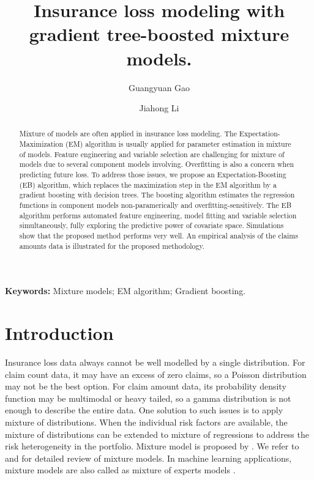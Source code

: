 \documentclass[11pt]{article}
\title{Insurance loss modeling with gradient tree-boosted mixture models.}
\author{Guangyuan Gao \and Jiahong Li}
\numberwithin{equation}{section}
\begin{document}
\maketitle

\begin{abstract}
Mixture of models are often applied in insurance loss modeling. 
The Expectation-Maximization (EM) algorithm is usually applied for parameter estimation in mixture of models. 
Feature engineering and variable selection are challenging for mixture of models due to several component models involving. 
Overfitting is also a concern when predicting future loss. 
To address those issues, we propose an Expectation-Boosting (EB) algorithm, 
which replaces the maximization step in the EM algorithm by a gradient boosting with decision trees. 
The boosting algorithm estimates the regression functions in component models non-paramerically and overfitting-sensitively. 
The EB algorithm performs automated feature engineering, model fitting and variable selection simultaneously, 
fully exploring the predictive power of covariate space.
Simulations show that the proposed method performs very well.
An empirical analysis of the claims amounts data is illustrated for the proposed methodology. 

\end{abstract}

{\bf Keywords:} Mixture models; EM algorithm; Gradient boosting.


\section{Introduction}

Insurance loss data always cannot be well modelled by a single distribution.
For claim count data, it may have an excess of zero claims, so a Poisson distribution may not be the best option.
For claim amount data, its probability density function may be multimodal or heavy tailed, so a gamma distribution is not enough to describe the entire data.
One solution to such issues is to apply mixture of distributions.
When the individual risk factors are available, the mixture of distributions can be extended to mixture of regressions to address the risk heterogeneity in the portfolio.
Mixture model is proposed by \citet{goldfeld1973markov}.
We refer to \citet{lindsay1995mixture} and \citet{peel2000finite} for detailed review of mixture models.
In machine learning applications, mixture models are also called as mixture of experts models \citep{jacobs1991adaptive,jiang1999hierarchical}.
\end{document}
